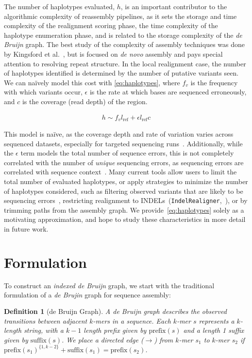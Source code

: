 \documentclass[11pt]{article}
\newtheorem{defn}{Definition}
\begin{document}
The number of haplotypes evaluated, $h$, is an important contributor to the algorithmic complexity of
reassembly pipelines, as it sets the storage and time complexity of the realignment scoring phase, the
time complexity of the haplotype enumeration phase, and is related to the storage complexity of the
\emph{de Bruijn} graph. The best study of the complexity of assembly techniques was done by Kingsford
et al.~\cite{kingsford10}, but is focused on \emph{de novo} assembly and pays special attention to
resolving repeat structure. In the local realignment case, the number of haplotypes identified is determined
by the number of putative variants seen. We can na\"{i}vely model this cost with \eqref{eq:haplotypes},
where $f_v$ is the frequency with which variants occur, $\epsilon$ is the rate at which bases are
sequenced erroneously, and $c$ is the coverage (read depth) of the region.

\begin{align}
\label{eq:haplotypes}
h \sim f_v l_{\text{ref}} + \epsilon l_{\text{ref}} c
\end{align}

This model is na\"{i}ve, as the coverage depth and rate of variation varies across sequenced datasets,
especially for targeted sequencing runs~\cite{fang14}. Additionally, while the $\epsilon$ term models the
total number of sequence errors, this is not completely correlated with the number of \emph{unique}
sequencing errors, as sequencing errors are correlated with sequence context~\cite{depristo11}. Many
current tools allow users to limit the total number of evaluated haplotypes, or apply strategies to minimize
the number of haplotypes considered, such as filtering observed variants that are likely to be sequencing
errors~\cite{garrison12}, restricting realignment to INDELs~(\texttt{IndelRealigner},~\cite{depristo11}), or
by trimming paths from the assembly graph. We provide~\eqref{eq:haplotypes} solely as a motivating
approximation, and hope to study these characteristics in more detail in future work.

\section{Formulation}
\label{sec:formulation}

To construct an \emph{indexed de Bruijn} graph, we start with the traditional formulation of a \emph{de
Brujin} graph for sequence assembly:

\begin{defn}[de Bruijn Graph]
\label{defn:dbg}
A de Bruijn graph describes the observed transitions between adjacent $k$-mers in a sequence. Each
$k$-mer $s$ represents a $k$-length string, with a $k - 1$ length prefix given by $\text{prefix}(s)$ and a
length 1 suffix given by $\text{suffix}(s)$. We place a directed edge ($\rightarrow$) from $k$-mer $s_1$ to
$k$-mer $s_2$ if $\text{prefix}(s_1)^{\{1, k - 2\}} + \text{suffix}(s_1) = \text{prefix}(s_2)$.
\end{defn}
\end{document}
